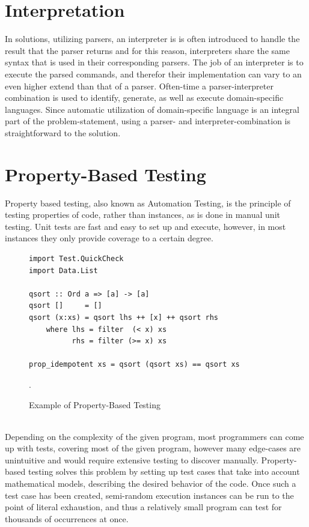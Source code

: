 \section{Interpretation}
In solutions, utilizing parsers, an interpreter is is often introduced to handle the result that the parser returns and for this reason, interpreters share the same syntax that is used in their corresponding parsers. The job of an interpreter is to execute the parsed commands, and therefor their implementation can vary to an even higher extend than that of a parser. Often-time a parser-interpreter combination is used to identify, generate, as well as execute domain-specific languages. Since automatic utilization of domain-specific language is an integral part of the problem-statement, using a parser- and interpreter-combination is straightforward to the solution.

\section{Property-Based Testing}

Property based testing, also known as Automation Testing, is the principle of testing properties of code, rather than instances, as is done in manual unit testing. Unit tests are fast and easy to set up and execute, however, in most instances they only provide coverage to a certain degree.

\begin{figure}[h]
	\centering
	\begin{lstlisting}
import Test.QuickCheck
import Data.List

qsort :: Ord a => [a] -> [a]
qsort []     = []
qsort (x:xs) = qsort lhs ++ [x] ++ qsort rhs
    where lhs = filter  (< x) xs
          rhs = filter (>= x) xs

prop_idempotent xs = qsort (qsort xs) == qsort xs
	\end{lstlisting}
	\caption{Example of Property-Based Testing~\cite{realWorldHaskell11}}.
	\label{fig:pbtEx}
\end{figure}\ \\

\noindent
Depending on the complexity of the given program, most programmers can come up with tests, covering most of the given program, however many edge-cases are unintuitive and would require extensive testing to discover manually. Property-based testing solves this problem by setting up test cases that take into account mathematical models, describing the desired behavior of the code. Once such a test case has been created, semi-random execution instances can be run to the point of literal exhaustion, and thus a relatively small program can test for thousands of occurrences at once.

